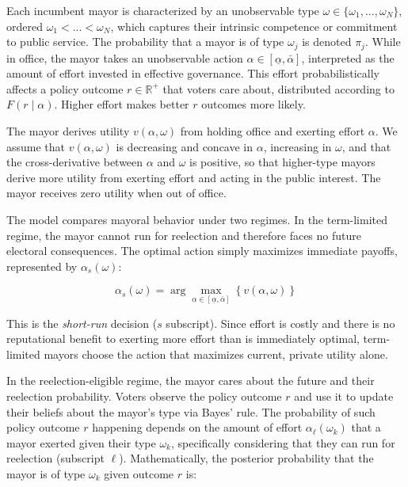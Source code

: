 \documentclass[12pt, a4paper]{article}
\begin{document}
Each incumbent mayor is characterized by an unobservable type $\omega \in \{\omega_1, ..., \omega_N\}$, ordered $\omega_1 < ... < \omega_N$, which captures their intrinsic competence or commitment to public service. The probability that a mayor is of type $\omega_j$ is denoted $\pi_j$. While in office, the mayor takes an unobservable action $\alpha \in [\underline{\alpha}, \bar{\alpha}]$, interpreted as the amount of effort invested in effective governance. This effort probabilistically affects a policy outcome $r \in \mathbb{R}^+$ that voters care about, distributed according to $F(r \; | \; \alpha)$. Higher effort makes better $r$ outcomes more likely.

The mayor derives utility $v(\alpha, \omega)$ from holding office and exerting effort $\alpha$. We assume that $v(\alpha, \omega)$ is decreasing and concave in $\alpha$, increasing in $\omega$, and that the cross-derivative between $\alpha$ and $\omega$ is positive, so that higher-type mayors derive more utility from exerting effort and acting in the public interest. The mayor receives zero utility when out of office.

The model compares mayoral behavior under two regimes. In the term-limited regime, the mayor cannot run for reelection and therefore faces no future electoral consequences. The optimal action simply maximizes immediate payoffs, represented by $\alpha_s(\omega)$:

\begin{equation}
    \alpha_s(\omega) = \arg\max_{\alpha \in [\underline{\alpha}, \bar{\alpha}]} \left\{ v(\alpha, \omega) \right\}
\end{equation}

This is the \textit{short-run} decision ($s$ subscript). Since effort is costly and there is no reputational benefit to exerting more effort than is immediately optimal, term-limited mayors choose the action that maximizes current, private utility alone.

In the reelection-eligible regime, the mayor cares about the future and their reelection probability. Voters observe the policy outcome $r$ and use it to update their beliefs about the mayor's type via Bayes' rule.  The probability of such policy outcome $r$ happening depends on the amount of effort $\alpha_\ell(\omega_k)$ that a mayor exerted given their type $\omega_k$, specifically considering that they can run for reelection (subscript $\ell$). Mathematically, the posterior probability that the mayor is of type $\omega_k$ given outcome $r$ is:
\end{document}
